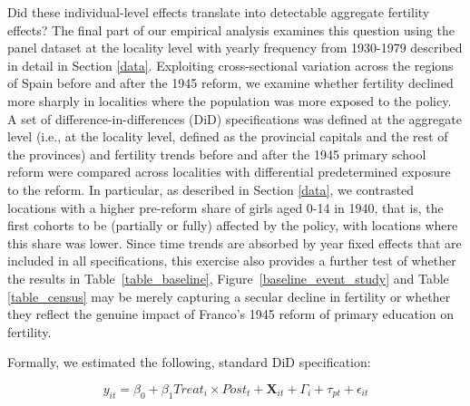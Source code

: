 \documentclass[a4paper,oneside,final,onecolumn,12pt,english]{article}
\begin{document}
Did these individual-level effects translate into detectable aggregate fertility effects? The final part of our empirical analysis examines this question using the panel dataset at the locality level with yearly frequency from 1930-1979 described in detail in Section \ref{data}. Exploiting cross-sectional variation across the regions of Spain before and after the 1945 reform, we examine whether fertility declined more sharply in localities where the population was more exposed to the policy. A set of difference-in-differences (DiD) specifications was defined at the aggregate level (i.e., at the locality level, defined as the provincial capitals and the rest of the provinces) and fertility trends before and after the 1945 primary school reform were compared across localities with differential predetermined exposure to the reform. In particular, as described in Section \ref{data}, we contrasted locations with a higher pre-reform share of girls aged 0-14 in 1940, that is, the first cohorts to be (partially or fully) affected by the policy, with locations where this share was lower. Since time trends are absorbed by year fixed effects that are included in all specifications, this exercise also provides a further test of whether the results in Table~\ref{table_baseline}, Figure~\ref{baseline_event_study} and Table \ref{table_census} may be merely capturing a secular decline in fertility or whether they reflect the genuine impact of Franco's 1945 reform of primary education on fertility.

Formally, we estimated the following, standard DiD specification:

\begin{equation}\label{eq_macro}
y_{it} =\beta_0+  \beta_1   \textit{Treat}_i \times \textit{Post}_t +\mathbf{X}_{it}+\Gamma_i+ \tau_{pt}+\epsilon_{it}
\end{equation}
\end{document}

